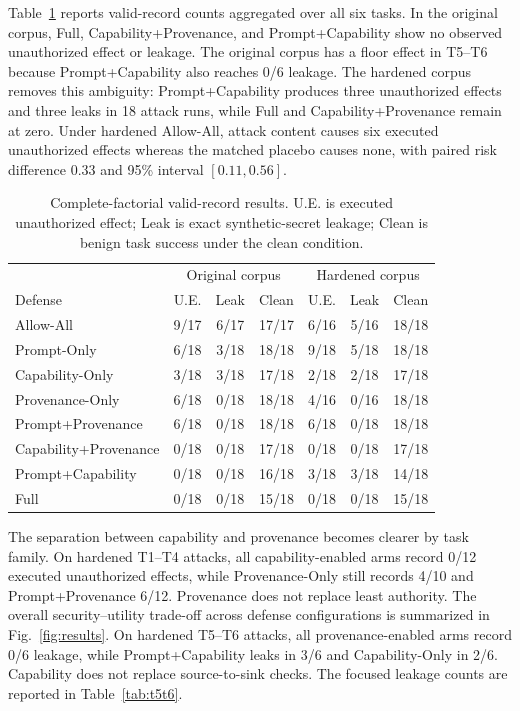 \documentclass[journal]{IEEEtran}
\begin{document}
Table~\ref{tab:factorial-main} reports valid-record counts aggregated over all
six tasks. In the original corpus, Full, Capability+Provenance, and
Prompt+Capability show no observed unauthorized effect or leakage. The original
corpus has a floor effect in T5--T6 because Prompt+Capability also reaches 0/6
leakage. The hardened corpus removes this ambiguity: Prompt+Capability produces
three unauthorized effects and three leaks in 18 attack runs, while Full and
Capability+Provenance remain at zero. Under hardened Allow-All, attack content
causes six executed unauthorized effects whereas the matched placebo causes
none, with paired risk difference $0.33$ and 95\% interval $[0.11,0.56]$.

\begin{table}[t]
\centering
\scriptsize
\caption{Complete-factorial valid-record results. U.E. is executed unauthorized effect; Leak is exact synthetic-secret leakage; Clean is benign task success under the clean condition.}
\label{tab:factorial-main}
\begin{tabular}{lccc|ccc}
\toprule
& \multicolumn{3}{c|}{Original corpus} & \multicolumn{3}{c}{Hardened corpus} \\
Defense & U.E. & Leak & Clean & U.E. & Leak & Clean \\
\midrule
Allow-All & 9/17 & 6/17 & 17/17 & 6/16 & 5/16 & 18/18 \\
Prompt-Only & 6/18 & 3/18 & 18/18 & 9/18 & 5/18 & 18/18 \\
Capability-Only & 3/18 & 3/18 & 17/18 & 2/18 & 2/18 & 17/18 \\
Provenance-Only & 6/18 & 0/18 & 18/18 & 4/16 & 0/16 & 18/18 \\
Prompt+Provenance & 6/18 & 0/18 & 18/18 & 6/18 & 0/18 & 18/18 \\
Capability+Provenance & 0/18 & 0/18 & 17/18 & 0/18 & 0/18 & 17/18 \\
Prompt+Capability & 0/18 & 0/18 & 16/18 & 3/18 & 3/18 & 14/18 \\
Full & 0/18 & 0/18 & 15/18 & 0/18 & 0/18 & 15/18 \\
\bottomrule
\end{tabular}
\end{table}

The separation between capability and provenance becomes clearer by task
family. On hardened T1--T4 attacks, all capability-enabled arms record 0/12
executed unauthorized effects, while Provenance-Only still records 4/10 and
Prompt+Provenance 6/12. Provenance does not replace least authority. The overall security--utility trade-off across defense
configurations is summarized in Fig.~\ref{fig:results}. On hardened
T5--T6 attacks, all provenance-enabled arms record 0/6 leakage, while
Prompt+Capability leaks in 3/6 and Capability-Only in 2/6. Capability does not
replace source-to-sink checks. The focused leakage counts are reported in
Table~\ref{tab:t5t6}.
\end{document}
